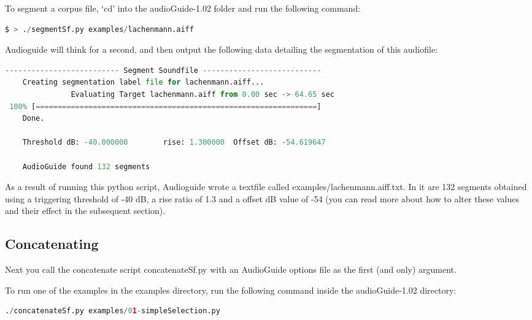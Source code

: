 \documentclass{article}
\begin{document}
\begin{spacing}{1.2}
To segment a corpus file, `cd' into the audioGuide-1.02 folder and run the following command:

\begin{lstlisting}[language=python]
$ > ./segmentSf.py examples/lachenmann.aiff
\end{lstlisting}

Audioguide will think for a second, and then output the following data detailing the segmentation of this audiofile:

\begin{lstlisting}[language=python]
-------------------------- Segment Soundfile ---------------------------
	Creating segmentation label file for lachenmann.aiff...
               Evaluating Target lachenmann.aiff from 0.00 sec -> 64.65 sec               
 100% [================================================================]
	Done.                                                                                     

	Threshold dB: -40.000000		rise: 1.300000	Offset dB: -54.619647

	AudioGuide found 132 segments
\end{lstlisting}

As a result of running this python script, Audioguide wrote a textfile called examples/lachenmann.aiff.txt.  In it are 132 segments obtained using a triggering threshold of -40 dB, a rise ratio of 1.3 and a offset dB value of -54 (you can read more about how to alter these values and their effect in the subsequent section).

\subsection{Concatenating}
Next you call the concatenate script concatenateSf.py with an AudioGuide options file as the first (and only) argument.  

To run one of the examples in the examples directory, run the following command inside the audioGuide-1.02 directory:
\begin{lstlisting}[language=python]
./concatenateSf.py examples/01-simpleSelection.py
\end{lstlisting}


\end{spacing}
\end{document}
